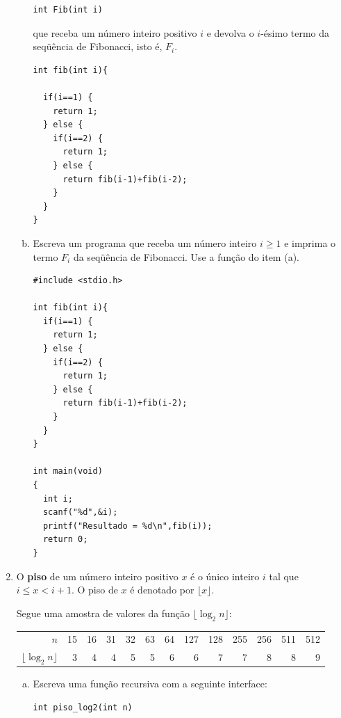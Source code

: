 \documentclass[a4paper,10pt]{article}
\begin{document}
\begin{enumerate}
\begin{enumerate}[(a)]
\begin{lstlisting}
int Fib(int i)
\end{lstlisting}

que receba um número inteiro positivo $i$ e devolva o $i$-ésimo termo da seqüência de Fibonacci, isto é, $F_i$. 

\begin{lstlisting}
int fib(int i){

  if(i==1) {
    return 1;
  } else {
    if(i==2) {
      return 1;
    } else {
      return fib(i-1)+fib(i-2);
    }
  }
}
\end{lstlisting}
  
\item Escreva um programa que receba um número inteiro $i \geq 1$ e imprima o termo $F_i$ da seqüência de Fibonacci. 
Use a função do item (a).

\begin{lstlisting}
#include <stdio.h>

int fib(int i){
  if(i==1) {
    return 1;
  } else {
    if(i==2) {
      return 1;
    } else {
      return fib(i-1)+fib(i-2);
    }
  }
}

int main(void)
{
  int i;
  scanf("%d",&i);
  printf("Resultado = %d\n",fib(i));
  return 0;
}
\end{lstlisting}

\end{enumerate}
\pagebreak

\item O \textbf{piso} de um número inteiro positivo $x$ é o único inteiro $i$ 
tal que $i \leq x < i + 1$. O piso de $x$ é denotado por $\lfloor x \rfloor$.   

Segue uma amostra de valores da função $\lfloor \log_2 n \rfloor$:

  \begin{center}
    \begin{tabular}{*{13}{r}}
      $n$ & 15 & 16 & 31 & 32 & 63 & 64 & 127 & 128 & 255 & 256 & 511
      & 512 \\ \cline{2-13}  
      $\lfloor \log_2 n \rfloor$ & 3 & 4 & 4 & 5 & 5 & 6 & 6 & 7 & 7 &
      8 & 8 & 9  
    \end{tabular}
  \end{center}

\begin{enumerate}[(a)]
\item Escreva uma função recursiva com a seguinte interface:

\begin{lstlisting}
int piso_log2(int n)
\end{lstlisting}


\end{enumerate}
\end{enumerate}
\end{document}
